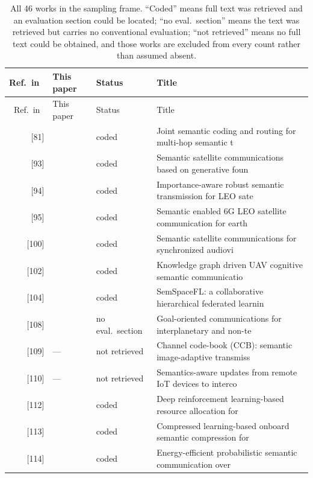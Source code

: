 \begin{longtable}{rll p{52mm}}
\caption{All 46 works in the sampling frame. ``Coded'' means full text was retrieved and an evaluation section could be located; ``no eval.\ section'' means the text was retrieved but carries no conventional evaluation; ``not retrieved'' means no full text could be obtained, and those works are excluded from every count rather than assumed absent.}
\label{tab:population}\\
\toprule
Ref.\ in~\cite{survey2026ntnsemcom} & This paper & Status & Title \\
\midrule
\endfirsthead
\toprule
Ref.\ in~\cite{survey2026ntnsemcom} & This paper & Status & Title \\
\midrule
\endhead
\bottomrule
\endfoot
{[81]} & \cite{zeng2026r81} & coded & Joint semantic coding and routing for multi-hop semantic t \\
{[93]} & \cite{jiang2024r93} & coded & Semantic satellite communications based on generative foun \\
{[94]} & \cite{cao2025r94} & coded & Importance-aware robust semantic transmission for LEO sate \\
{[95]} & \cite{hassan2024r95} & coded & Semantic enabled 6G LEO satellite communication for earth  \\
{[100]} & \cite{liu2026r100} & coded & Semantic satellite communications for synchronized audiovi \\
{[102]} & \cite{song2024r102} & coded & Knowledge graph driven UAV cognitive semantic communicatio \\
{[104]} & \cite{nguyen2025r104} & coded & SemSpaceFL: a collaborative hierarchical federated learnin \\
{[108]} & \cite{uysal2024r108} & no eval.\ section & Goal-oriented communications for interplanetary and non-te \\
{[109]} & --- & not retrieved & Channel code-book (CCB): semantic image-adaptive transmiss \\
{[110]} & --- & not retrieved & Semantics-aware updates from remote IoT devices to interco \\
{[112]} & \cite{huang2024r112} & coded & Deep reinforcement learning-based resource allocation for  \\
{[113]} & \cite{bhattacharjee2024r113} & coded & Compressed learning-based onboard semantic compression for \\
{[114]} & \cite{zhao2024r114} & coded & Energy-efficient probabilistic semantic communication over \\

\end{longtable}
